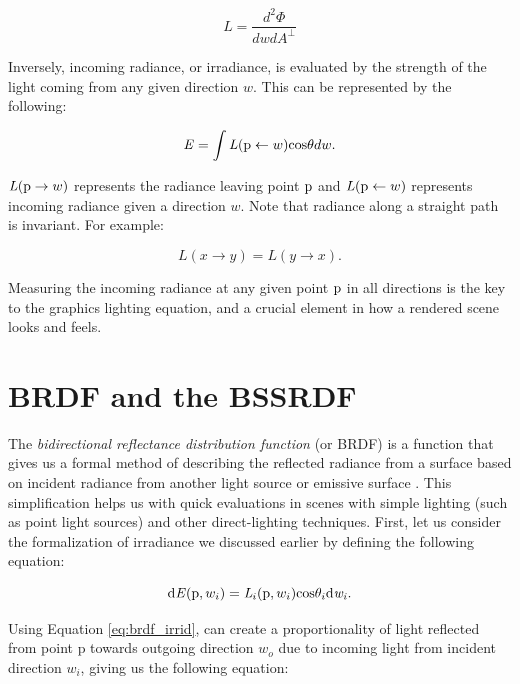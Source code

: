 \begin{equation}
\mathit{L} = \frac{\mathit{d^{2}\Phi}}{\mathit{dwdA}^\perp}
\label{eq:radiance}
\end{equation}

Inversely, incoming radiance, or irradiance, is evaluated by the strength of the light coming from any given direction $w$.  This  can be represented by the following:

\begin{equation}
\mathit{E} = \int\mathit{L}(\textup{p} \leftarrow w)\textup{cos}\theta dw.
\label{eq:irradiance}
\end{equation}

$\mathit{L}(\textup{p} \to w)$ represents the radiance leaving point $\textup{p}$ and $\mathit{L}(\textup{p} \leftarrow w)$ represents incoming radiance given a direction $w$.  Note that radiance along a straight path is invariant.  For example:

\begin{equation}
L(x \to y) = L(y \to x).
\label{eq:invariance}
\end{equation}

Measuring the incoming radiance at any given point $\textup{p}$ in all directions is the key to the graphics lighting equation, and a crucial element in how a rendered scene looks and feels.

\section{BRDF and the BSSRDF}

The \textit{bidirectional reflectance distribution function} (or BRDF) is a function that gives us a formal method of describing the reflected radiance from a surface based on incident radiance from another light source or emissive surface \cite{pbrt}.  This simplification helps us with quick evaluations in scenes with simple lighting (such as point light sources) and other direct-lighting techniques.  First, let us consider the formalization of irradiance we discussed earlier by defining the following equation:

\begin{equation}
\textup{d}\mathit{E}(\textup{p}, w_{i}) = \mathit{L}_{i}(\textup{p}, w_{i})\textup{cos}\theta_{i} \textup{d}\mathit{w_{i}}.
\label{eq:brdf_irrid}
\end{equation}

Using Equation \ref{eq:brdf_irrid}, can create a proportionality of light reflected from point p towards outgoing direction $w_o$ due to incoming light from incident direction $w_i$, giving us the following equation:

